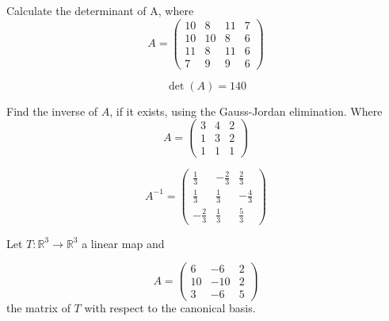 \begin{questions}

\question Calculate the determinant of A, where
$$
A=\left(\begin{array}{rrrr}
10 & 8 & 11 & 7 \\
10 & 10 & 8 & 6 \\
11 & 8 & 11 & 6 \\
7 & 9 & 9 & 6
\end{array}\right)
$$

\begin{solution}
$$\det(A)=140$$
\end{solution}

\question Find the inverse of $A$, if it exists, using the Gauss-Jordan elimination. Where
$$
A=\left(\begin{array}{rrr}
3 & 4 & 2 \\
1 & 3 & 2 \\
1 & 1 & 1
\end{array}\right)
$$

\begin{solution}
$$A^{-1}=\left(\begin{array}{rrr}
\frac{1}{3} & -\frac{2}{3} & \frac{2}{3} \\
\frac{1}{3} & \frac{1}{3} & -\frac{4}{3} \\
-\frac{2}{3} & \frac{1}{3} & \frac{5}{3}
\end{array}\right)$$
\end{solution}

\question Let $T:\mathbb{R}^3\rightarrow\mathbb{R}^3$  a linear map and
 
$$
A=\left(\begin{array}{rrr}
6 & -6 & 2 \\
10 & -10 & 2 \\
3 & -6 & 5
\end{array}\right)
$$
the matrix of $T$ with respect to the canonical basis.
\end{questions}
